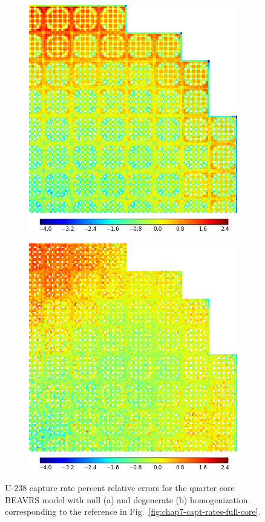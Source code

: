 \begin{figure}[h!]
\centering
\begin{subfigure}{\textwidth}
  \centering
  \includegraphics[width=0.6\linewidth]{figures/quantification/full-core/capt-err-null}
  \caption{}
  \label{fig:chap8-full-core-capt-err-null}
\end{subfigure}
\vspace{4mm}
\begin{subfigure}{\textwidth}
  \centering
  \includegraphics[width=0.6\linewidth]{figures/quantification/full-core/capt-err-degenerate}
  \caption{}
  \label{fig:chap8-full-core-capt-err-degenerate}
\end{subfigure}
\caption[U-238 capture rate errors for BEAVRS]{U-238 capture rate percent relative errors for the quarter core \ac{BEAVRS} model with null (a) and degenerate (b) homogenization corresponding to the reference in Fig.~\ref{fig:chap7-capt-rates-full-core}.}
\label{fig:chap8-full-core-capt-err}
\end{figure}

